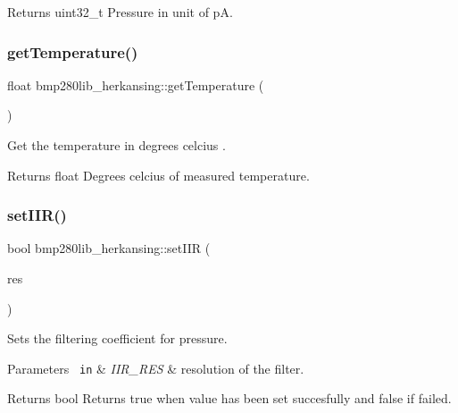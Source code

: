 \begin{DoxyReturn}{Returns}
uint32\+\_\+t Pressure in unit of pA. 
\end{DoxyReturn}
\mbox{\label{classbmp280lib__herkansing_aa92e440eb6fe9ca0e0622bbcc244478c}} 
\subsubsection{\texorpdfstring{getTemperature()}{getTemperature()}}
{\footnotesize\ttfamily float bmp280lib\+\_\+herkansing\+::get\+Temperature (\begin{DoxyParamCaption}{ }\end{DoxyParamCaption})}



Get the temperature in degrees celcius . 

\begin{DoxyReturn}{Returns}
float Degrees celcius of measured temperature. 
\end{DoxyReturn}
\mbox{\label{classbmp280lib__herkansing_a61d6c72faa2af2fbd32294467a3cb9da}} 
\subsubsection{\texorpdfstring{setIIR()}{setIIR()}}
{\footnotesize\ttfamily bool bmp280lib\+\_\+herkansing\+::set\+I\+IR (\begin{DoxyParamCaption}\item[{I\+I\+R\+\_\+\+R\+ES}]{res }\end{DoxyParamCaption})}



Sets the filtering coefficient for pressure. 


\begin{DoxyParams}[1]{Parameters}
\mbox{\texttt{ in}}  & {\em I\+I\+R\+\_\+\+R\+ES} & resolution of the filter. \\
\hline
\end{DoxyParams}
\begin{DoxyReturn}{Returns}
bool Returns true when value has been set succesfully and false if failed. 
\end{DoxyReturn}
\mbox{\label{classbmp280lib__herkansing_a6c594dd38b45498ab69bf4489d77f7da}} 
